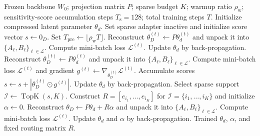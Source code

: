 \begin{algorithm}[!htbp]
\small
\caption{{ProLoSA} with Warmup SNIP Support Selection}
\label{alg:prolosa}
\begin{algorithmic}[1]
\REQUIRE Frozen backbone $W_0$; projection matrix $P$; sparse budget $K$; warmup ratio $\rho_{\mathrm{w}}$; sensitivity-score accumulation steps $T_{\mathrm{s}}=128$; total training steps $T$.
\STATE Initialize compressed latent parameter $\theta_d$.
\STATE Set sparse adapter inactive and initialize score vector $s \leftarrow 0_D$.
\STATE Set $T_{\mathrm{pre}}\leftarrow\lfloor\rho_{\mathrm{w}}T\rfloor$.
    \STATE Reconstruct $\theta_D^{(t)} \leftarrow P\theta_d^{(t)}$ and unpack it into $\{A_\ell,B_\ell\}_{\ell\in\mathcal{L}}$.
    \STATE Compute mini-batch loss $\mathcal{L}^{(t)}$.
    \STATE Update $\theta_d$ by back-propagation.
\ENDFOR
{}
    \STATE Reconstruct $\theta_D^{(t)} \leftarrow P\theta_d^{(t)}$ and unpack it into $\{A_\ell,B_\ell\}_{\ell\in\mathcal{L}}$.
    \STATE Compute mini-batch loss $\mathcal{L}^{(t)}$ and gradient $g^{(t)} \leftarrow \nabla_{\theta_D^{(t)}}\mathcal{L}^{(t)}$.
    \STATE Accumulate scores $s \leftarrow s+\left|\theta_D^{(t)}\odot g^{(t)}\right|$.
    \STATE Update $\theta_d$ by back-propagation.
\ENDFOR
\STATE Select sparse support $\mathcal{I}\leftarrow\operatorname{TopK}(s,K)$.
\STATE Construct $R=[e_{i_1},\ldots,e_{i_K}]$ for $\mathcal{I}=\{i_1,\ldots,i_K\}$ and initialize $\alpha\leftarrow 0$.
    \STATE Reconstruct $\theta_D \leftarrow P\theta_d+R\alpha$ and unpack it into $\{A_\ell,B_\ell\}_{\ell\in\mathcal{L}}$.
    \STATE Compute mini-batch loss $\mathcal{L}^{(t)}$.
    \STATE Update $\theta_d$ and $\alpha$ by back-propagation.
\ENDFOR
\RETURN Trained $\theta_d$, $\alpha$, and fixed routing matrix $R$.
\end{algorithmic}
\end{algorithm}


